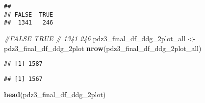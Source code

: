 \documentclass[
]{article}
\newenvironment{Shaded}{\begin{snugshade}}{\end{snugshade}}
\newcommand{\CommentTok}[1]{\textcolor[rgb]{0.56,0.35,0.01}{\textit{#1}}}
\newcommand{\FunctionTok}[1]{\textcolor[rgb]{0.13,0.29,0.53}{\textbf{#1}}}
\newcommand{\NormalTok}[1]{#1}
\newcommand{\OtherTok}[1]{\textcolor[rgb]{0.56,0.35,0.01}{#1}}
\newcommand{\SpecialCharTok}[1]{\textcolor[rgb]{0.81,0.36,0.00}{\textbf{#1}}}
\begin{document}
\begin{verbatim}
## 
## FALSE  TRUE 
##  1341   246
\end{verbatim}

\begin{Shaded}
\begin{Highlighting}[]
\CommentTok{\#FALSE  TRUE }
\CommentTok{\# 1341   246 }
\NormalTok{pdz3\_final\_df\_ddg\_2plot\_all }\OtherTok{\textless{}{-}}\NormalTok{ pdz3\_final\_df\_ddg\_2plot}
\FunctionTok{nrow}\NormalTok{(pdz3\_final\_df\_ddg\_2plot\_all)}
\end{Highlighting}
\end{Shaded}

\begin{verbatim}
## [1] 1587
\end{verbatim}

\begin{Shaded}
\end{Shaded}

\begin{verbatim}
## [1] 1567
\end{verbatim}

\begin{Shaded}
\begin{Highlighting}[]
\FunctionTok{head}\NormalTok{(pdz3\_final\_df\_ddg\_2plot)}
\end{Highlighting}
\end{Shaded}
\end{document}
